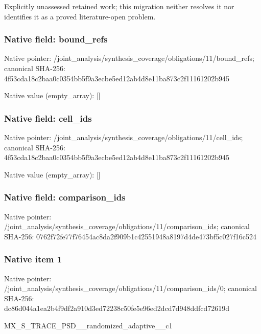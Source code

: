 \documentclass[10pt,a4paper]{article}
\begin{document}
\begingroup\raggedright\sloppy Explicitly unassessed retained work;\allowbreak{} this migration neither resolves it nor identifies it as a proved literature-open problem.\par\endgroup

\subsubsection{Native field: bound\_\allowbreak{}refs}
Native pointer: /joint\_\allowbreak{}analysis/synthesis\_\allowbreak{}coverage/obligations/11/bound\_\allowbreak{}refs; canonical SHA-256: 4f53cda18c2baa0c0354bb5f9a3ecbe5ed12ab4d8e11ba873c2f11161202b945

Native value (empty\_\allowbreak{}array): []

\subsubsection{Native field: cell\_\allowbreak{}ids}
Native pointer: /joint\_\allowbreak{}analysis/synthesis\_\allowbreak{}coverage/obligations/11/cell\_\allowbreak{}ids; canonical SHA-256: 4f53cda18c2baa0c0354bb5f9a3ecbe5ed12ab4d8e11ba873c2f11161202b945

Native value (empty\_\allowbreak{}array): []

\subsubsection{Native field: comparison\_\allowbreak{}ids}
Native pointer: /joint\_\allowbreak{}analysis/synthesis\_\allowbreak{}coverage/obligations/11/comparison\_\allowbreak{}ids; canonical SHA-256: 0762f72fe77f76454ac8da2f909b1c42551948a8197d4de473bf5c027f16c524

\subsubsection{Native item 1}
Native pointer: /joint\_\allowbreak{}analysis/synthesis\_\allowbreak{}coverage/obligations/11/comparison\_\allowbreak{}ids/0; canonical SHA-256: dc86d044a1ea2b4f9df2a910d3ed72238c50fe5e96ed2dcd7d948ddfcd72619d

\begingroup\raggedright\sloppy MX\_\allowbreak{}S\_\allowbreak{}TRACE\_\allowbreak{}PSD\_\allowbreak{}\_\allowbreak{}randomized\_\allowbreak{}adaptive\_\allowbreak{}\_\allowbreak{}c1\par\endgroup
\end{document}
